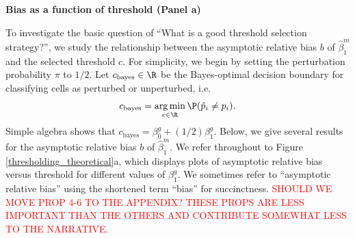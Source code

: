 \documentclass[12pt]{article}
\DeclareMathOperator*{\argmin}{arg\,min}
\begin{document}
\begin{center}
\textbf{Bias as a function of threshold (Panel a)}
\end{center}

To investigate the basic question of ``What is a good threshold selection strategy?'', we study the relationship between the asymptotic relative bias $b$ of $\hat{\beta}^m_1$ and the selected threshold $c$. For simplicity, we begin by setting the perturbation probability $\pi$ to $1/2$. Let $c_\textrm{bayes} \in \R$ be the Bayes-optimal decision boundary for classifying cells as perturbed or unperturbed, i.e. $$c_\textrm{bayes} = \argmin_{c \in \R} \P(\hat{p}_i \neq p_i).$$ Simple algebra shows that $c_\textrm{bayes} = \beta_0^g + (1/2) \beta^g_1.$ Below, we give several results for the asymptotic relative bias $b$ of $\hat{\beta}^m_1$. We refer throughout to Figure \ref{thresholding_theoretical}a, which displays plots of asymptotic relative bias versus threshold for different values of $\beta^g_1$. We sometimes refer to ``asymptotic relative bias'' using the shortened term ``bias'' for succinctness. \textcolor{red}{SHOULD WE MOVE PROP 4-6 	TO THE APPENDIX? THESE PROPS ARE LESS IMPORTANT THAN THE OTHERS AND CONTRIBUTE SOMEWHAT LESS TO THE NARRATIVE.}
\end{document}
